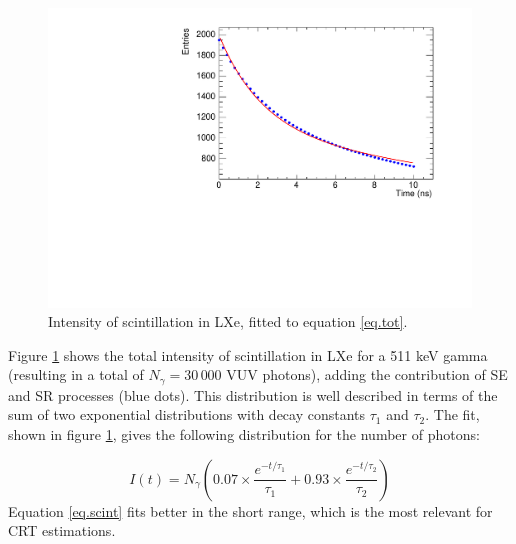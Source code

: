 \documentclass[review]{elsarticle}
\begin{document}
\begin{figure}[!bhtp]
	\centering
	\includegraphics[scale=0.6]{../img/Fit10ns_ROOT.pdf}
	\caption{\label{fig.scint} Intensity of scintillation in LXe, fitted to equation \ref{eq.tot}. }
\end{figure}

Figure \ref{fig.scint} shows the total intensity of scintillation in LXe for a 511 keV gamma (resulting in a total of $N_\gamma =30\,000$ VUV photons), adding the contribution of SE and SR processes (blue dots). This distribution is well described in terms of the sum of two exponential distributions with decay constants $\tau_1$ and $\tau_2$. The fit, shown in figure \ref{fig.scint}, gives the following distribution for the number of photons: 

\begin{equation}
I(t) = N_\gamma (0.07 \times \frac{e^{-t/\tau_1}}{\tau_1} + 0.93 \times \frac{e^{-t/\tau_2}}{\tau_2})
\label{eq.scint}
\end{equation}
%
Equation \ref{eq.scint} fits better in the short range, which is the most relevant for CRT estimations.
\end{document}
